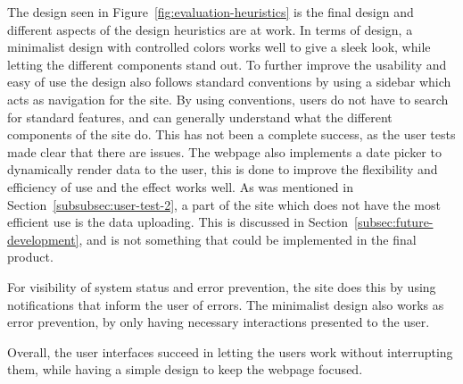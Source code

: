 The design seen in Figure~\ref{fig:evaluation-heuristics} is the final design
and different aspects of the design heuristics are at work.
In terms of design, a minimalist design with controlled colors works well
to give a sleek look, while letting the different components stand out.
To further improve the usability and easy of use the design also follows
standard conventions by using a sidebar which acts as navigation for the site.
By using conventions, users do not have to search for standard features, and
can generally understand what the different components of the site do.
This has not been a complete success, as the user tests made clear that there
are issues.
The webpage also implements a date picker to dynamically render data to the user,
this is done to improve the flexibility and efficiency of use and the effect
works well.
As was mentioned in Section~\ref{subsubsec:user-test-2}, a part of the site which
does not have the most efficient use is the data uploading.
This is discussed in Section~\ref{subsec:future-development}, and is not something
that could be implemented in the final product.

For visibility of system status and error prevention, the site does this by using
notifications that inform the user of errors.
The minimalist design also works as error prevention, by only having necessary
interactions presented to the user.

Overall, the user interfaces succeed in letting the users work without interrupting
them, while having a simple design to keep the webpage focused.

